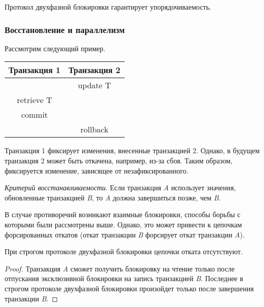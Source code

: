 \begin{proposition}
	Протокол двухфазной блокировки гарантирует упорядочиваемость.
\end{proposition}

\subsubsection{Восстановление и параллелизм}

Рассмотрим следующий пример.

\begin{center}
	\begin{tabular}{|c c|}
		\hline
		Транзакция 1 & Транзакция 2 \\
		\hline
		             & update T     \\
		retrieve T   &              \\
		commit       &              \\
		             & rollback     \\
		\hline
	\end{tabular}
\end{center}

Транзакция 1 фиксирует изменения, внесенные транзакцией 2. Однако, в будущем транзакция 2 может
быть откачена, например, из-за сбоя. Таким образом, фиксируется изменение, зависящее от
незафиксированного.

\begin{definition}
	\textit{Критерий восстанавливаемости}. Если транзакция \textit{A} использует значения,
	обновленные транзакцией \textit{B}, то \textit{A} должна завершиться позже,
	чем \textit{B}.
\end{definition}

В случае противоречий возникают взаимные блокировки, способы борьбы с которыми были рассмотрены
выше. Однако, это может привести к цепочкам форсированных откатов (откат транзакции
\textit{B} форсирует откат транзакции \textit{A}).

\begin{proposition}
	При строгом протоколе двухфазной блокировки цепочки отката отсутствуют.
\end{proposition}

\begin{proof}
	Транзакция \textit{A} сможет получить блокировку на чтение только после отпускания
	эксклюзивной блокировки на запись транзакцией \textit{B}. Последнее в строгом протоколе
	двухфазной блокировки произойдет только после завершения транзакции \textit{B}.
\end{proof}

